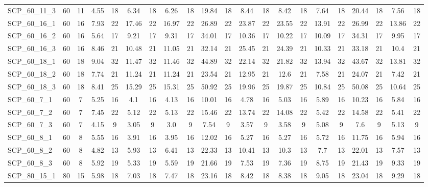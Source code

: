 \begin{sidewaystable}[!ht]
{\begin{tabular}{lcccccccccccccccccccc}
SCP\_60\_11\_3 & 60 & 11 &  \textcolor{blue2}{4.55} & 18 & 6.34 & 18 & 6.26 & 18 & 19.84 & 18 & 8.44 & 18 & 8.42 & 18 & 7.64 & 18 & 20.44 & 18 & 7.56 & 18 \\
SCP\_60\_16\_1 & 60 & 16 &  \textcolor{blue2}{7.93} & 22 & 17.46 & 22 & 16.97 & 22 & 26.89 & 22 & 23.87 & 22 & 23.55 & 22 & 13.91 & 22 & 26.99 & 22 & 13.86 & 22 \\
SCP\_60\_16\_2 & 60 & 16 &  \textcolor{blue2}{5.64} & 17 & 9.21 & 17 & 9.31 & 17 & 34.01 & 17 & 10.36 & 17 & 10.22 & 17 & 10.09 & 17 & 34.31 & 17 & 9.95 & 17 \\
SCP\_60\_16\_3 & 60 & 16 &  \textcolor{blue2}{8.46} & 21 & 10.48 & 21 & 11.05 & 21 & 32.14 & 21 & 25.45 & 21 & 24.39 & 21 & 10.33 & 21 & 33.18 & 21 & 10.4 & 21 \\
SCP\_60\_18\_1 & 60 & 18 &  \textcolor{blue2}{9.04} & 32 & 11.47 & 32 & 11.46 & 32 & 44.89 & 32 & 22.14 & 32 & 21.82 & 32 & 13.94 & 32 & 43.67 & 32 & 13.81 & 32 \\
SCP\_60\_18\_2 & 60 & 18 & 7.74 & 21 & 11.24 & 21 & 11.24 & 21 & 23.54 & 21 & 12.95 & 21 & 12.6 & 21 & 7.58 & 21 & 24.07 & 21 &  \textcolor{blue2}{7.42} & 21 \\
SCP\_60\_18\_3 & 60 & 18 &  \textcolor{blue2}{8.41} & 25 & 15.29 & 25 & 15.31 & 25 & 50.92 & 25 & 19.96 & 25 & 19.87 & 25 & 10.84 & 25 & 50.08 & 25 & 10.64 & 25 \\
SCP\_60\_7\_1 & 60 & 7 & 5.25 & 16 &  \textcolor{blue2}{4.1} & 16 & 4.13 & 16 & 10.01 & 16 & 4.78 & 16 & 5.03 & 16 & 5.89 & 16 & 10.23 & 16 & 5.84 & 16 \\
SCP\_60\_7\_2 & 60 & 7 & 7.45 & 22 &  \textcolor{blue2}{5.12} & 22 & 5.13 & 22 & 15.46 & 22 & 13.74 & 22 & 14.08 & 22 & 5.42 & 22 & 14.58 & 22 & 5.41 & 22 \\
SCP\_60\_7\_3 & 60 & 7 & 4.15 & 9 & 3.05 & 9 &  \textcolor{blue2}{3.0} & 9 & 7.54 & 9 & 3.57 & 9 & 3.58 & 9 & 5.08 & 9 & 7.6 & 9 & 5.13 & 9 \\
SCP\_60\_8\_1 & 60 & 8 & 5.55 & 16 &  \textcolor{blue2}{3.91} & 16 & 3.95 & 16 & 12.02 & 16 & 5.27 & 16 & 5.27 & 16 & 5.72 & 16 & 11.75 & 16 & 5.94 & 16 \\
SCP\_60\_8\_2 & 60 & 8 &  \textcolor{blue2}{4.82} & 13 & 5.93 & 13 & 6.41 & 13 & 22.33 & 13 & 10.41 & 13 & 10.3 & 13 & 7.7 & 13 & 22.01 & 13 & 7.57 & 13 \\
SCP\_60\_8\_3 & 60 & 8 & 5.92 & 19 &  \textcolor{blue2}{5.33} & 19 & 5.59 & 19 & 21.66 & 19 & 7.53 & 19 & 7.36 & 19 & 8.75 & 19 & 21.43 & 19 & 9.33 & 19 \\
SCP\_80\_15\_1 & 80 & 15 &  \textcolor{blue2}{5.98} & 18 & 7.03 & 18 & 7.47 & 18 & 23.16 & 18 & 8.42 & 18 & 8.38 & 18 & 9.05 & 18 & 23.04 & 18 & 9.29 & 18 \\

\end{tabular}}
\end{sidewaystable}
